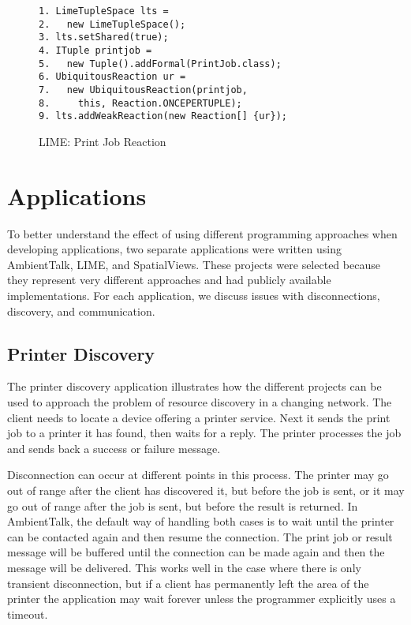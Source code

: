 \documentclass{sig-alternate}
\begin{document}
\begin{figure}
\centering
\begin{verbatim}
1. LimeTupleSpace lts = 
2.   new LimeTupleSpace();
3. lts.setShared(true);
4. ITuple printjob = 
5.   new Tuple().addFormal(PrintJob.class);
6. UbiquitousReaction ur = 
7.   new UbiquitousReaction(printjob, 
8.     this, Reaction.ONCEPERTUPLE);
9. lts.addWeakReaction(new Reaction[] {ur});
\end{verbatim}
\caption{LIME: Print Job Reaction}
\label{fig:lpj}
\end{figure}

\section{Applications}

To better understand the effect of using different programming approaches when developing applications, two separate applications were written using AmbientTalk, LIME, and SpatialViews. These projects were selected because they represent very different approaches and had publicly available implementations. For each application, we discuss issues with disconnections, discovery, and communication.

\subsection{Printer Discovery}

The printer discovery application illustrates how the different projects can be used to approach the problem of resource discovery in a changing network. The client needs to locate a device offering a printer service. Next it sends the print job to a printer it has found, then waits for a reply. The printer processes the job and sends back a success or failure message.

Disconnection can occur at different points in this process. The printer may go out of range after the client has discovered it, but before the job is sent, or it may go out of range after the job is sent, but before the result is returned. In AmbientTalk, the default way of handling both cases is to wait until the printer can be contacted again and then resume the connection. The print job or result message will be buffered until the connection can be made again and then the message will be delivered. This works well in the case where there is only transient disconnection, but if a client has permanently left the area of the printer the application may wait forever unless the programmer explicitly uses a timeout.
\end{document}
